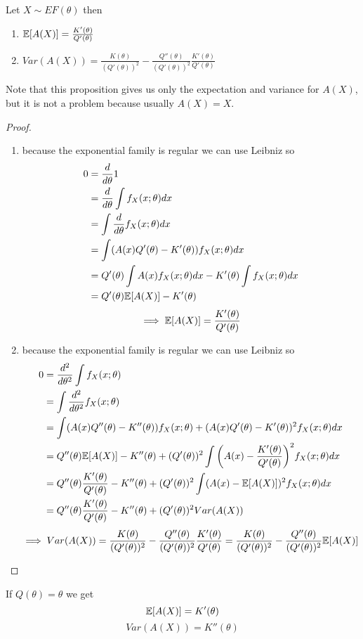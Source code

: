 \begin{prop}
	Let $X\sim EF(\theta)$ then
	\begin{enumerate}
		\item $\mathbb{E}[A(X)]=\frac{K'(\theta)}{Q'(\theta)}$
		\item $Var(A(X))=\frac{K(\theta)}{(Q'(\theta))^2}-\frac{Q''(\theta)}{(Q'(\theta))^2}\frac{K'(\theta)}{Q'(\theta)}$
	\end{enumerate}
\end{prop}
Note that this proposition gives us only the expectation and variance for $A(X)$, but it is not a problem because usually $A(X)=X$.
\begin{proof}
	\begin{enumerate}
		\item because the exponential family is regular we can use Leibniz so \[
		\begin{split}
		0
		&=\frac{d}{d\theta} 1\\
		&=\frac{d}{d\theta}\int f_X(x;\theta)dx\\
		&=\int \frac{d}{d\theta} f_X(x;\theta)dx\\
		&=\int (A(x)Q'(\theta)-K'(\theta))f_X(x;\theta)dx\\
		&=Q'(\theta)\int A(x) f_X(x;\theta)dx-K'(\theta)\int f_X(x;\theta)dx\\
		&=Q'(\theta)\mathbb{E}[A(X)]-K'(\theta)
		\end{split}
		\]
		\[\implies \mathbb{E}[A(X)]=\frac{K'(\theta)}{Q'(\theta)}\]
		\item because the exponential family is regular we can use Leibniz so
		\[
		\begin{split}
		0
		&=\frac{d^2}{d\theta^2}\int f_X(x;\theta)\\
		&=\int \frac{d^2}{d\theta^2} f_X(x;\theta)\\
		&=\int (A(x)Q''(\theta)-K''(\theta))f_X(x;\theta)+(A(x)Q'(\theta)-K'(\theta))^2f_X(x;\theta)dx\\
		&=Q''(\theta)\mathbb{E}[A(X)]-K''(\theta)+(Q'(\theta))^2\int \bigg( A(x)-\frac{K'(\theta)}{Q'(\theta)} \bigg)^2 f_X(x;\theta)dx\\
		&=Q''(\theta)\frac{K'(\theta)}{Q'(\theta)}-K''(\theta)+(Q'(\theta))^2\int ( A(x)-\mathbb{E}[A(X)] )^2 f_X(x;\theta)dx\\
		&=Q''(\theta)\frac{K'(\theta)}{Q'(\theta)}-K''(\theta)+(Q'(\theta))^2Var(A(X))\\
		\end{split}
		\]
		\[
		\implies Var(A(X))=\frac{K(\theta)}{(Q'(\theta))^2}-\frac{Q''(\theta)}{(Q'(\theta))^2}\frac{K'(\theta)}{Q'(\theta)}=\frac{K(\theta)}{(Q'(\theta))^2}-\frac{Q''(\theta)}{(Q'(\theta))^2}\mathbb{E}[A(X)]
		\]
	\end{enumerate}
\end{proof}
\begin{oss}
	If $Q(\theta)=\theta$ we get$$\mathbb{E}[A(X)]=K'(\theta)$$
	$$Var(A(X))=K''(\theta)$$
\end{oss}
